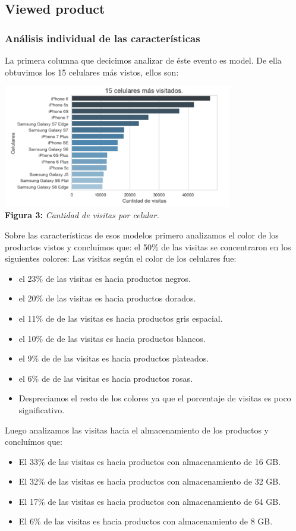 \documentclass[titlepage,a4paper]{article}
\begin{document}
	\subsection{Viewed product}
	\subsubsection{Análisis individual de las características}
	La primera columna que decicimos analizar de éste evento es model. De ella obtuvimos los 15 celulares más vistos, ellos son:
	\begin{center}
	\includegraphics[width=10cm]{15celularesMasVisitados.jpg}\\
	\textbf{Figura 3:}  \textit{Cantidad de visitas por celular.}
	\end{center}
	 Sobre las características de esos modelos primero analizamos el color de los productos vistos y concluímos que: el 50\% de las visitas se concentraron en los siguientes colores:
	 Las visitas según el color de los celulares fue:
	\begin{itemize}
	\item el 23\% de las visitas es hacia productos negros.
	\item el 20\% de las visitas es hacia productos dorados.
	\item el 11\% de de las visitas es hacia productos gris espacial.
    \item el 10\% de de las visitas es hacia productos blancos.
     \item el 9\% de de las visitas es hacia productos plateados.
     \item el 6\% de de las visitas es hacia productos rosas.
     \item Despreciamos el resto de los colores ya que el porcentaje de visitas es poco significativo. 
	\end{itemize}	   
	Luego analizamos las visitas hacia el almacenamiento de los productos y concluímos que:
	\begin{itemize}
	\item El 33\% de las visitas es hacia productos con almacenamiento de 16 GB.
    \item El 32\% de las visitas es hacia productos con almacenamiento de 32 GB.
    \item El 17\% de las visitas es hacia productos con almacenamiento de 64 GB.
    \item El 6\% de las visitas es hacia productos con almacenamiento de 8 GB.
	\end{itemize}
\end{document}

